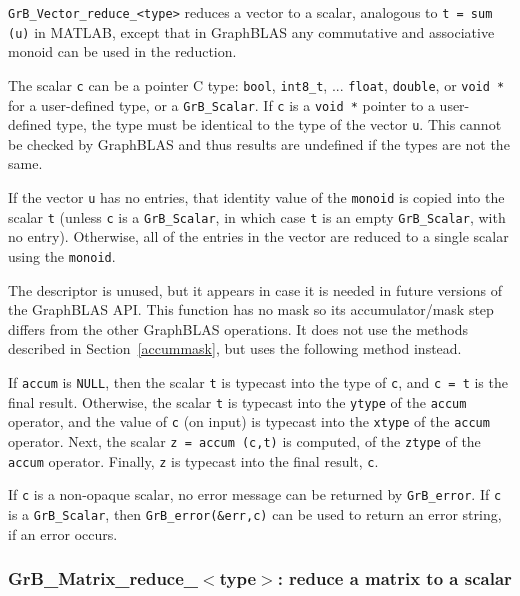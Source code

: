 \documentclass[12pt]{article}
\begin{document}
\verb'GrB_Vector_reduce_<type>'
reduces a vector to a scalar, analogous to \verb't = sum (u)' in MATLAB,
except that in GraphBLAS any commutative and associative monoid can be used
in the reduction.

The scalar \verb'c' can be a pointer C type: \verb'bool', \verb'int8_t', ...
\verb'float', \verb'double', or \verb'void *' for a user-defined type,
or a \verb'GrB_Scalar'.
If \verb'c' is a \verb'void *' pointer to a user-defined type,
the type must be identical to the type of the vector \verb'u'.
This cannot be checked by GraphBLAS and thus results are undefined if the
types are not the same.

If the vector \verb'u' has no entries, that identity value of the \verb'monoid'
is copied into the scalar \verb't' (unless \verb'c' is a \verb'GrB_Scalar',
in which case \verb't' is an empty \verb'GrB_Scalar', with no entry).
Otherwise, all of the entries in the
vector are reduced to a single scalar using the \verb'monoid'.

The descriptor is unused, but it appears in case it is needed in future
versions of the GraphBLAS API.
This function has no mask so its accumulator/mask step differs from the other
GraphBLAS operations.  It does not use the methods described in
Section~\ref{accummask}, but uses the following method instead.

If \verb'accum' is \verb'NULL', then the scalar \verb't' is typecast into the
type of \verb'c', and \verb'c = t' is the final result.  Otherwise, the scalar
\verb't' is typecast into the \verb'ytype' of the \verb'accum' operator, and
the value of \verb'c' (on input) is typecast into the \verb'xtype' of the
\verb'accum' operator.  Next, the scalar \verb'z = accum (c,t)' is computed, of
the \verb'ztype' of the \verb'accum' operator.  Finally, \verb'z' is typecast
into the final result, \verb'c'.

If \verb'c' is a non-opaque scalar, no error message can be returned by
\verb'GrB_error'.  If \verb'c' is a \verb'GrB_Scalar', then
\verb'GrB_error(&err,c)' can be used to return an error string, if an error
occurs.

\newpage
\subsubsection{{\sf GrB\_Matrix\_reduce\_$<$type$>$:} reduce a matrix to a scalar}
\label{reduce_matrix_to_scalar}
\end{document}
